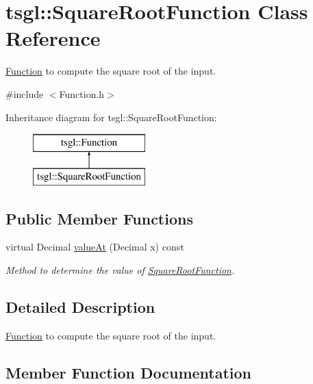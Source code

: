 \hypertarget{classtsgl_1_1_square_root_function}{}\section{tsgl\+:\+:Square\+Root\+Function Class Reference}
\label{classtsgl_1_1_square_root_function}


\hyperlink{classtsgl_1_1_function}{Function} to compute the square root of the input.  




{\ttfamily \#include $<$Function.\+h$>$}

Inheritance diagram for tsgl\+:\+:Square\+Root\+Function\+:\begin{figure}[H]
\begin{center}
\leavevmode
\includegraphics[height=2.000000cm]{classtsgl_1_1_square_root_function}
\end{center}
\end{figure}
\subsection*{Public Member Functions}
\begin{DoxyCompactItemize}
\item 
virtual Decimal \hyperlink{classtsgl_1_1_square_root_function_ad77fa33b36dcf3bcb7d7957e489bf33f}{value\+At} (Decimal x) const
\begin{DoxyCompactList}\small\item\em Method to determine the value of \hyperlink{classtsgl_1_1_square_root_function}{Square\+Root\+Function}. \end{DoxyCompactList}\end{DoxyCompactItemize}


\subsection{Detailed Description}
\hyperlink{classtsgl_1_1_function}{Function} to compute the square root of the input. 

\subsection{Member Function Documentation}
\mbox{\label{classtsgl_1_1_square_root_function_ad77fa33b36dcf3bcb7d7957e489bf33f}} 
